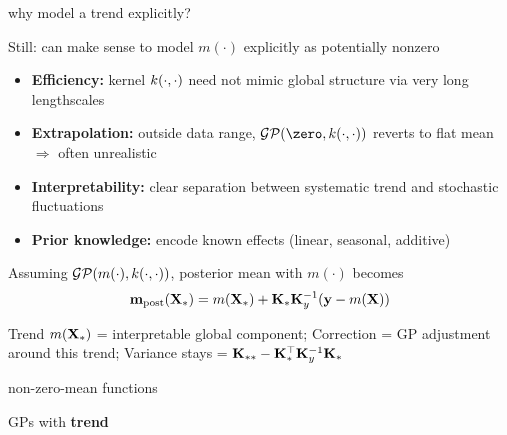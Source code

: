\documentclass[11pt,compress,t,notes=noshow, xcolor=table]{beamer}
\begin{document}

\begin{framei}[sep=L]{why model a trend explicitly?}
\item Still: can make sense to model $m(\cdot)$ explicitly as potentially nonzero
\begin{itemize}
  \item \textbf{Efficiency:} kernel $k(\cdot, \cdot)$ need not mimic global structure via very long lengthscales
  \item \textbf{Extrapolation:} outside data range, $\GPzk$ reverts to flat mean \\ $\Rightarrow$ often unrealistic
  \item \textbf{Interpretability:} clear separation between systematic trend and stochastic fluctuations
  \item \textbf{Prior knowledge:} encode known effects (linear, seasonal, additive)
\end{itemize}
\item Assuming $\mathcal{GP}(m(\cdot), k(\cdot, \cdot))$, posterior mean with $m(\cdot)$ becomes
$$\mathbf{m}_{\text{post}}(\mathbf{X}_\ast) = m(\mathbf{X}_\ast) + \mathbf{K}_{\ast} \mathbf{K}_y^{-1}(\mathbf{y} - m(\mathbf{X}))$$
\item Trend $m(\mathbf{X}_\ast)$ = interpretable global component; Correction = GP adjustment around this trend; Variance stays = $\mathbf{K}_{\ast \ast} - \mathbf{K}_{\ast}^\top \mathbf{K}_y^{-1}\mathbf{K}_{\ast}$
\end{framei}




\begin{framei}[sep=M]{non-zero-mean functions}
\item GPs with \textbf{trend}
\vfill
{}
\vfill
{}
\end{framei}
\end{document}
